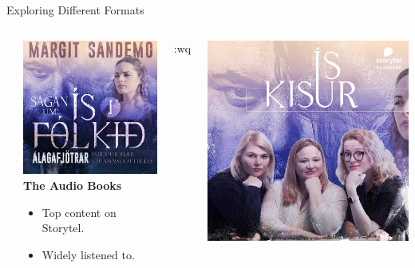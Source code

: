 \begin{frame}{Exploring Different Formats}
\begin{columns}[T]
\begin{column}{0.32\textwidth}
    \end{column}
\pause
    \begin{column}{0.32\textwidth}
        \includegraphics[width=\textwidth]{../figures/álagafjötrar_storytel}\\
      \textbf{The Audio Books}
      \begin{itemize}
        \item Top content on Storytel.
        \item Widely listened to.
      \end{itemize}
    \end{column}
\pause
:wq    \begin{column}{0.32\textwidth}
  \includegraphics[width=\textwidth]{../figures/álagafjötrar_ískisur}\\

\end{column}
\end{columns}
\end{frame}
